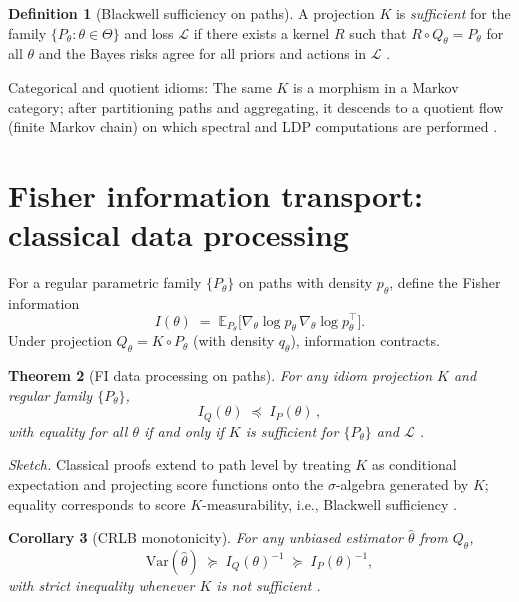 \documentclass[11pt]{article}
\theoremstyle{plain}
\newtheorem{theorem}{Theorem}
\newtheorem{corollary}[theorem]{Corollary}
\theoremstyle{definition}
\newtheorem{definition}[theorem]{Definition}
\theoremstyle{remark}
\newcommand{\E}{\mathbb{E}}
\newcommand{\1}{\mathbbm{1}}
\newcommand{\Var}{\mathrm{Var}}
\begin{document}
\begin{definition}[Blackwell sufficiency on paths]
A projection \(K\) is \emph{sufficient} for the family \(\{P_\theta:\theta\in\Theta\}\) and loss \(\mathcal{L}\) if there exists a kernel \(R\) such that \(R\circ Q_\theta=P_\theta\) for all \(\theta\) and the Bayes risks agree for all priors and actions in \(\mathcal{L}\) \parencite{Blackwell1953}.
\end{definition}

\noindent Categorical and quotient idioms: The same \(K\) is a morphism in a Markov category; after partitioning paths and aggregating, it descends to a quotient flow (finite Markov chain) on which spectral and LDP computations are performed \parencite{elliott2025flow,elliott2025qfi}.

\section{Fisher information transport: classical data processing}
For a regular parametric family \(\{P_\theta\}\) on paths with density \(p_\theta\), define the Fisher information
\[
I(\theta)\;=\;\E_{P_\theta}\!\big[\nabla_\theta \log p_\theta\,\nabla_\theta \log p_\theta^\top\big].
\]
Under projection \(Q_\theta=K\circ P_\theta\) (with density \(q_\theta\)), information contracts.

\begin{theorem}[FI data processing on paths]\label{thm:fi-dpi}
For any idiom projection \(K\) and regular family \(\{P_\theta\}\),
\[
I_{Q}(\theta)\;\preceq\; I_{P}(\theta)\,,
\]
with equality for all \(\theta\) if and only if \(K\) is sufficient for \(\{P_\theta\}\) and \(\mathcal{L}\) \parencite{Blackwell1953,AmariNagaoka2000,Cencov1982}.
\end{theorem}

\noindent\emph{Sketch.} Classical proofs extend to path level by treating \(K\) as conditional expectation and projecting score functions onto the \(\sigma\)-algebra generated by \(K\); equality corresponds to score \(K\)-measurability, i.e., Blackwell sufficiency \parencite[Ch.\ 2, 3]{AmariNagaoka2000,Cencov1982}.

\begin{corollary}[CRLB monotonicity]\label{cor:crlb}
For any unbiased estimator \(\hat\theta\) from \(Q_\theta\),
\[
\Var(\hat\theta)\;\succeq\; I_Q(\theta)^{-1}\;\succeq\; I_P(\theta)^{-1},
\]
with strict inequality whenever \(K\) is not sufficient \parencite[Ch.\ 2]{CoverThomas2006}.
\end{corollary}
\end{document}
